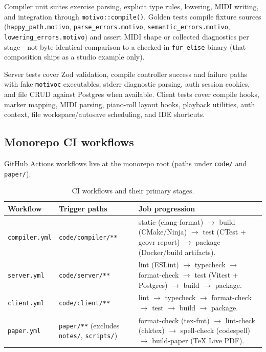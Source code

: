 Compiler unit suites exercise parsing, explicit type rules, lowering, MIDI writing, and integration through
\texttt{motivo::compile()}.
Golden tests compile fixture sources (\texttt{happy\_path.motivo}, \texttt{parse\_errors.motivo},
\texttt{semantic\_errors.motivo}, \texttt{lowering\_errors.motivo}) and assert MIDI shape or collected diagnostics per
stage---not byte-identical comparison to a checked-in \texttt{fur\_elise} binary (that composition ships as a studio
example only).

Server tests cover Zod validation, compile controller success and failure paths with fake \texttt{motivoc}
executables, stderr diagnostic parsing, auth session cookies, and file CRUD against Postgres when available.
Client tests cover compile hooks, marker mapping, MIDI parsing, piano-roll layout hooks, playback utilities, auth
context, file workspace/autosave scheduling, and IDE shortcuts.

\subsection{Monorepo CI workflows}\label{subsec:ci-workflows}

GitHub Actions workflows live at the monorepo root (paths under \texttt{code/} and \texttt{paper/}).

\begin{table}[htbp]
  \centering
  \renewcommand{\arraystretch}{1.25}
  \begin{tabularx}{\textwidth}{>{\raggedright\arraybackslash}p{2.6cm}>{\raggedright\arraybackslash}p{3.2cm}X}
    \toprule
    \textbf{Workflow} & \textbf{Trigger paths} & \textbf{Job progression} \\
    \midrule
    \texttt{compiler.yml} & \texttt{code/compiler/**} & static (clang-format) $\rightarrow$ build (CMake/Ninja)
    $\rightarrow$ test (CTest + gcovr report) $\rightarrow$ package (Docker/build artifacts). \\
    \texttt{server.yml} & \texttt{code/server/**} & lint (ESLint) $\rightarrow$ typecheck $\rightarrow$ format-check
    $\rightarrow$ test (Vitest + Postgres) $\rightarrow$ build $\rightarrow$ package. \\
    \texttt{client.yml} & \texttt{code/client/**} & lint $\rightarrow$ typecheck $\rightarrow$ format-check
    $\rightarrow$
    test $\rightarrow$ build $\rightarrow$ package. \\
    \texttt{paper.yml} & \texttt{paper/**} (excludes \texttt{notes/}, \texttt{scripts/}) & format-check (tex-fmt)
    $\rightarrow$ lint-check (chktex) $\rightarrow$ spell-check (codespell) $\rightarrow$ build-paper (TeX Live PDF). \\
    \bottomrule
  \end{tabularx}
  \caption{CI workflows and their primary stages.}\label{tab:ci-workflows}
\end{table}

